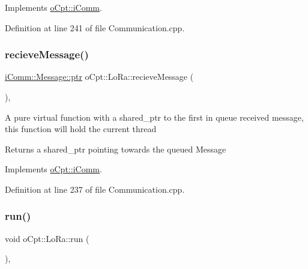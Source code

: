 Implements \hyperlink{classo_cpt_1_1i_comm_a27a57fb90cfc9cce21552e8539f08dd7}{o\+Cpt\+::i\+Comm}.



Definition at line 241 of file Communication.\+cpp.

\hypertarget{classo_cpt_1_1_lo_ra_a191e265a569a80c53e6829d57d402969}{}\label{classo_cpt_1_1_lo_ra_a191e265a569a80c53e6829d57d402969} 
\subsubsection{\texorpdfstring{recieve\+Message()}{recieveMessage()}}
{\footnotesize\ttfamily \hyperlink{structo_cpt_1_1i_comm_1_1_message_ad2ba828ad76f96a30e3898b2609a4c01}{i\+Comm\+::\+Message\+::ptr} o\+Cpt\+::\+Lo\+Ra\+::recieve\+Message (\begin{DoxyParamCaption}{ }\end{DoxyParamCaption})\hspace{0.3cm}{\ttfamily [override]}, {\ttfamily [virtual]}}

A pure virtual function with a shared\+\_\+ptr to the first in queue received message, this function will hold the current thread \begin{DoxyReturn}{Returns}
a shared\+\_\+ptr pointing towards the queued Message 
\end{DoxyReturn}


Implements \hyperlink{classo_cpt_1_1i_comm_a054ee0448f0d2773abce97c424c5c20c}{o\+Cpt\+::i\+Comm}.



Definition at line 237 of file Communication.\+cpp.

\hypertarget{classo_cpt_1_1_lo_ra_aacbca715826b810736e9bf5c3a9ce338}{}\label{classo_cpt_1_1_lo_ra_aacbca715826b810736e9bf5c3a9ce338} 
\subsubsection{\texorpdfstring{run()}{run()}}
{\footnotesize\ttfamily void o\+Cpt\+::\+Lo\+Ra\+::run (\begin{DoxyParamCaption}{ }\end{DoxyParamCaption})\hspace{0.3cm}{\ttfamily [override]}, {\ttfamily [virtual]}}

